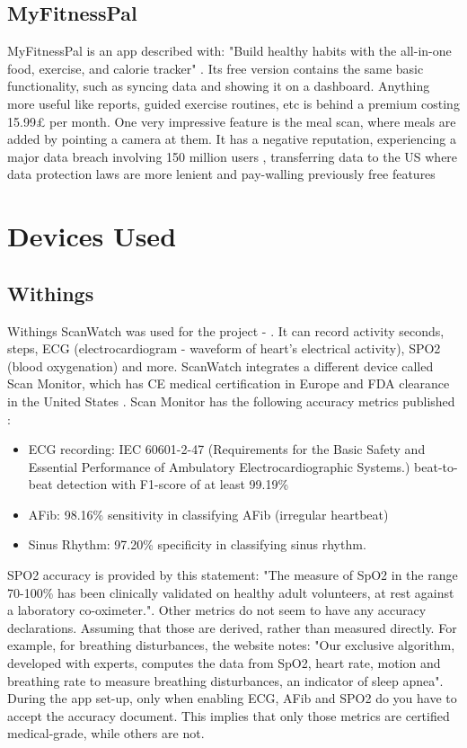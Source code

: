 \subsection{MyFitnessPal}
MyFitnessPal is an app described with: "Build healthy habits with the all-in-one food, exercise, and calorie tracker" \cite{fitnesspal}. Its free version contains the same basic functionality, such as syncing data and showing it on a dashboard. Anything more useful like reports, guided exercise routines, etc is behind a premium costing 15.99£ per month. One very impressive feature is the meal scan, where meals are added by pointing a camera at them. It has a negative reputation, experiencing a major data breach involving 150 million users \cite{masuch2021fitness, myFitnessPalDataBreach}, transferring data to the US \cite{myfitnesspalTransferring} where data protection laws are more lenient and pay-walling previously free features \cite{myfitnesspalPaywall}

\section{Devices Used}
\subsection{Withings}
\label{section:WithingsWatch}
Withings ScanWatch was used for the project - \cite{withingsStorePage}. It can record activity seconds, steps, ECG (electrocardiogram - waveform of heart's electrical activity), SPO2 (blood oxygenation) and more. ScanWatch integrates a different device called Scan Monitor, which has CE medical certification in Europe and FDA clearance in the United States \cite{withingsStorePage}.  Scan Monitor has the following accuracy metrics published \cite{scanMonitor}:
\begin{itemize}
    \item ECG recording: IEC 60601-2-47 (Requirements for the Basic Safety and Essential Performance of Ambulatory Electrocardiographic Systems.) beat-to-beat detection with F1-score of at least 99.19\% 
    \item AFib: 98.16\% sensitivity in classifying AFib (irregular heartbeat)
    \item Sinus Rhythm: 97.20\% specificity in classifying sinus rhythm.
\end{itemize}
SPO2 accuracy is provided by this statement: "The measure of SpO2 in the range 70-100\% has been clinically validated on healthy adult volunteers, at rest against a laboratory co-oximeter.". \cite{scanMonitor}
Other metrics do not seem to have any accuracy declarations. Assuming that those are derived, rather than measured directly. For example, for breathing disturbances, the website notes: "Our exclusive algorithm, developed with experts, computes the data from SpO2, heart rate, motion and breathing rate to measure breathing disturbances, an indicator of sleep apnea". During the app set-up, only when enabling ECG, AFib and SPO2 do you have to accept the accuracy document. This implies that only those metrics are certified medical-grade, while others are not.


